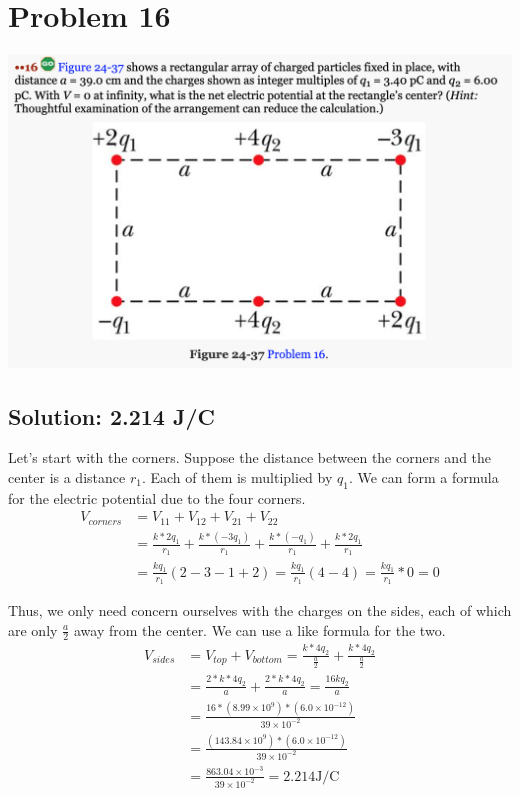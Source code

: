 \documentclass[12pt]{article}
\begin{document}
\section{Problem 16}
\includegraphics[width=\textwidth]{picture_9.png}

\subsection*{Solution: 2.214 \unit{\joule/\coulomb}}
Let's start with the corners.
Suppose the distance between the corners and the center is a distance $r_1$. Each of them is multiplied by $q_1$.
We can form a formula for the electric potential due to the four corners.
\begin{align*}
    V_{corners} &=  V_{11} + V_{12} + V_{21} + V_{22}\\
        &=  \frac{k*2q_1}{r_1} + \frac{k*(-3q_1)}{r_1} + \frac{k*(-q_1)}{r_1} + \frac{k*2q_1}{r_1}\\
        &=  \frac{kq_1}{r_1}(2 - 3 - 1 + 2)
        =   \frac{kq_1}{r_1}(4 - 4)
        =   \frac{kq_1}{r_1} * 0
        =   0
\end{align*}

Thus, we only need concern ourselves with the charges on the sides, each of which are only $\frac{a}{2}$ away from the center.
We can use a like formula for the two.
\begin{align*}
    V_{sides}   &=  V_{top} + V_{bottom}
        =   \frac{k*4q_2}{\frac{a}{2}} + \frac{k*4q_2}{\frac{a}{2}}\\
        &=  \frac{2*k*4q_2}{a} + \frac{2*k*4q_2}{a}
        =   \frac{16kq_2}{a}\\
        &=  \frac{16 * (8.99 \times 10^9) * (6.0 \times 10^{-12})}{39 \times 10^{-2}}\\
        &=  \frac{(143.84 \times 10^9) * (6.0 \times 10^{-12})}{39 \times 10^{-2}}\\
        &=  \frac{863.04 \times 10^{-3}}{39 \times 10^{-2}}
        =   \boxed{2.214 \unit{\joule/\coulomb}}
\end{align*}
\pagebreak
\end{document}
